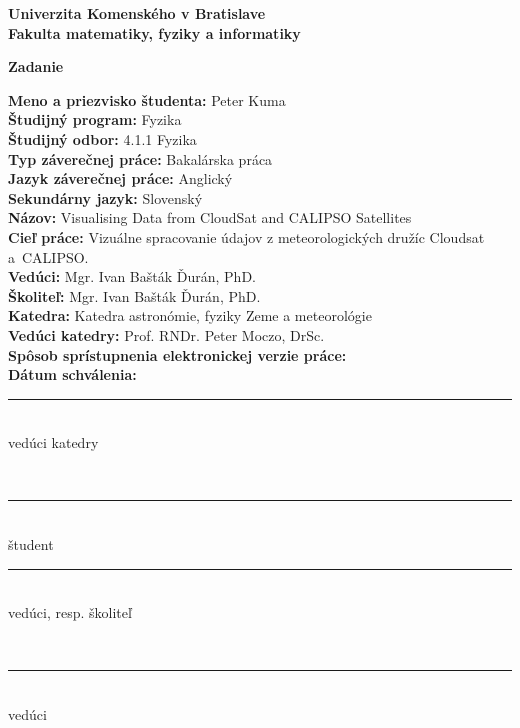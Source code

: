 \begin{titlepage}
\thispagestyle{plain}
\begin{center}
\Large\bfseries Univerzita Komenského v Bratislave\\Fakulta matematiky, fyziky a informatiky\\
\end{center}
\vspace{25pt}
{\LARGE\bfseries Zadanie}\\[5mm]
\begin{flushleft}
\normalsize\mdseries\onehalfspacing
\textbf{Meno a priezvisko študenta:} Peter Kuma\\
\textbf{Študijný program:} Fyzika\\
\textbf{Študijný odbor:} 4.1.1 Fyzika\\
\textbf{Typ záverečnej práce:} Bakalárska práca\\
\textbf{Jazyk záverečnej práce:} Anglický\\
\textbf{Sekundárny jazyk:} Slovenský\\[6pt]

\textbf{Názov:} Visualising Data from CloudSat and CALIPSO Satellites\\
\textbf{Cieľ práce:} Vizuálne spracovanie údajov z meteorologických družíc Cloudsat a~CALIPSO.\\[6pt]

\textbf{Vedúci:} Mgr. Ivan Bašták Ďurán, PhD.\\
\textbf{Školiteľ:} Mgr. Ivan Bašták Ďurán, PhD.\\
\textbf{Katedra:} Katedra astronómie, fyziky Zeme a meteorológie\\
\textbf{Vedúci katedry:} Prof. RNDr. Peter Moczo, DrSc.\\
\textbf{Spôsob sprístupnenia elektronickej verzie práce:} \\[6pt]

\textbf{Dátum schválenia:} \\

\vfill

\hfill\begin{minipage}{150pt}\rule{150pt}{0.3pt}\\\centering vedúci katedry\end{minipage}\\[2.5cm]
\begin{minipage}{150pt}\rule{150pt}{0.3pt}\\\centering študent\end{minipage}
\hfill
\begin{minipage}{150pt}\rule{150pt}{0.3pt}\\\centering vedúci, resp. školiteľ\end{minipage}\\[2.5cm]


\begin{minipage}{150pt}\rule{150pt}{0.3pt}\\\centering vedúci\end{minipage}

\end{flushleft}

\end{titlepage}